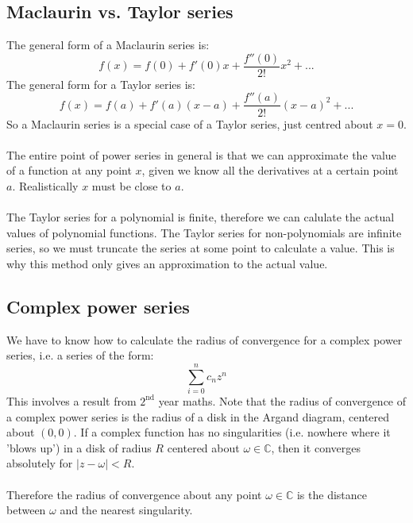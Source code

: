 \documentclass{scrartcl}
\newcommand{\C}{\mathbb{C}}
\begin{document}
\subsection{Maclaurin vs. Taylor series}
The general form of a Maclaurin series is:
\begin{equation}
f(x) = f(0) + f'(0)x + \frac{f''(0)}{2!}x^{2} + ...
\end{equation}
The general form for a Taylor series is:
\begin{equation}
f(x) = f(a) + f'(a)(x-a) + \frac{f''(a)}{2!}(x - a)^{2} + ...
\end{equation}
So a Maclaurin series is a special case of a Taylor series, just centred about $ x = 0 $.
\\\\
The entire point of power series in general is that we can approximate the value of a function at any point $ x $, given we know all the derivatives at a certain point $ a $. Realistically $ x $ must be close to $ a $.
\\\\
The Taylor series for a polynomial is finite, therefore we can calulate the actual values of polynomial functions. The Taylor series for non-polynomials are infinite series, so we must truncate the series at some point to calculate a value. This is why this method only gives an approximation to the actual value.

\subsection{Complex power series} \label{complexpowerseries}

We have to know how to calculate the radius of convergence for a complex power series, i.e. a series of the form:
\begin{equation}
\sum_{i=0}^{n} c_{n} z^{n}
\end{equation}
This involves a result from $ 2^{\textrm{nd}} $ year maths. Note that the radius of convergence of a complex power series is the radius of a disk in the Argand diagram, centered about $ (0, 0) $. If a complex function has no singularities (i.e. nowhere where it 'blows up') in a disk of radius $ R $ centered about $ \omega \in \C $, then it converges absolutely for $ |z - \omega| < R $.
\\\\
Therefore the radius of convergence about any point $ \omega \in \C $ is the distance between $ \omega $ and the nearest singularity.
\end{document}

